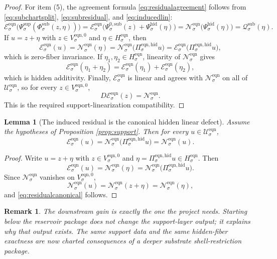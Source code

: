\documentclass[11pt]{article}
\newcommand{\EqnSpace}[1]{\mathcal U_{#1}^{\mathrm{eqn}}}
\newcommand{\EqnResidual}[1]{\mathcal E_{#1}^{\mathrm{eqn}}}
\newcommand{\EqnZero}[1]{V_{#1}^{\mathrm{eqn},0}}
\newcommand{\EqnHidden}[1]{H_{#1}^{\mathrm{eqn}}}
\newcommand{\EqnProj}[1]{\Pi_{#1}^{\mathrm{eqn,hid}}}
\newcommand{\EqnLin}[1]{\mathcal N_{#1}^{\mathrm{eqn}}}
\newcommand{\ShellChart}[1]{\Psi_{#1}^{\mathrm{sup}}}
\newcommand{\HiddenChart}[1]{\Psi_{#1}^{\mathrm{hid}}}
\newcommand{\SubZeroChart}[1]{\Psi_{#1}^{0,\mathrm{sub}}}
\newcommand{\SubSplit}[1]{\Phi_{#1}^{\mathrm{sub}}}
\newcommand{\SubCharge}[1]{\mathcal Q_{#1}^{\mathrm{sub}}}
\newtheorem{lemma}{Lemma}
\newtheorem{remark}{Remark}
\begin{document}
\begin{proof}
For item (5), the agreement formula \eqref{eq:residualagreement} follows from \eqref{eq:subchartsplit}, \eqref{eq:subresidual}, and \eqref{eq:inducedlin}:
\[
\EqnResidual{\sigma}\bigl(\ShellChart{\sigma}(\SubSplit{\sigma}(z,\eta))\bigr)
=
\EqnResidual{\sigma}\bigl(\SubZeroChart{\sigma}(z)+\HiddenChart{\sigma}(\eta)\bigr)
=
\EqnLin{\sigma}\bigl(\HiddenChart{\sigma}(\eta)\bigr)
=
\SubCharge{\sigma}(\eta).
\]
If \(u=z+\eta\) with \(z\in\EqnZero{\sigma}\) and \(\eta\in\EqnHidden{\sigma}\), then
\[
\EqnResidual{\sigma}(u)
=
\EqnLin{\sigma}(\eta)
=
\EqnLin{\sigma}\bigl(\EqnProj{\sigma}u\bigr)
=
\EqnResidual{\sigma}\bigl(\EqnProj{\sigma}u\bigr),
\]
which is zero-fiber invariance. If \(\eta_{1},\eta_{2}\in\EqnHidden{\sigma}\), linearity of \(\EqnLin{\sigma}\) gives
\[
\EqnResidual{\sigma}(\eta_{1}+\eta_{2})
=
\EqnResidual{\sigma}(\eta_{1})
+
\EqnResidual{\sigma}(\eta_{2}),
\]
which is hidden additivity. Finally, \(\EqnResidual{\sigma}\) is linear and agrees with \(\EqnLin{\sigma}\) on all of \(\EqnSpace{\sigma}\), so for every \(z\in\EqnZero{\sigma}\),
\[
D\EqnResidual{\sigma}(z)=\EqnLin{\sigma}.
\]
This is the required support-linearization compatibility.
\end{proof}

\begin{lemma}[The induced residual is the canonical hidden linear defect]
\label{lem:canonical}
Assume the hypotheses of Proposition \ref{prop:support}. Then for every \(u\in\EqnSpace{\sigma}\),
\begin{equation}
\EqnResidual{\sigma}(u)
=
\EqnLin{\sigma}\bigl(\EqnProj{\sigma}u\bigr)
=
\EqnLin{\sigma}(u).
\label{eq:residualcanonical}
\end{equation}
\end{lemma}

\begin{proof}
Write \(u=z+\eta\) with \(z\in\EqnZero{\sigma}\) and \(\eta=\EqnProj{\sigma}u\in\EqnHidden{\sigma}\). Then
\[
\EqnResidual{\sigma}(u)
=
\EqnLin{\sigma}(\eta)
=
\EqnLin{\sigma}\bigl(\EqnProj{\sigma}u\bigr).
\]
Since \(\EqnLin{\sigma}\) vanishes on \(\EqnZero{\sigma}\),
\[
\EqnLin{\sigma}(u)
=
\EqnLin{\sigma}(z+\eta)
=
\EqnLin{\sigma}(\eta),
\]
and \eqref{eq:residualcanonical} follows.
\end{proof}

\begin{remark}
The downstream gain is exactly the one the project needs. Starting below the reservoir package does not change the support-layer output; it explains why that output exists. The same support data and the same hidden-fiber exactness are now charted consequences of a deeper substrate shell-restriction package.
\end{remark}
\end{document}
